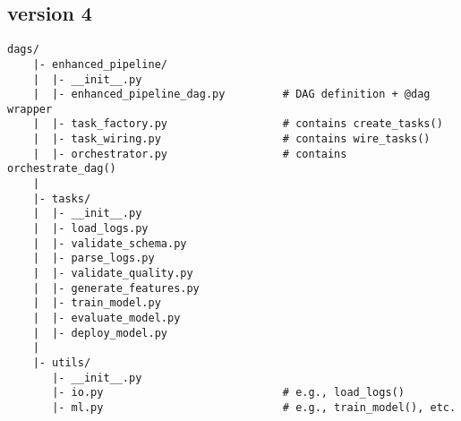 \subsection{version 4}

\begin{lstlisting}[style=tree, caption={Modular DAG file structure (ASCII-safe)}, label={lst:dag_tree_ascii}]
    dags/
    |- enhanced_pipeline/
    |  |- __init__.py
    |  |- enhanced_pipeline_dag.py         # DAG definition + @dag wrapper
    |  |- task_factory.py                  # contains create_tasks()
    |  |- task_wiring.py                   # contains wire_tasks()
    |  |- orchestrator.py                  # contains orchestrate_dag()
    |
    |- tasks/
    |  |- __init__.py
    |  |- load_logs.py
    |  |- validate_schema.py
    |  |- parse_logs.py
    |  |- validate_quality.py
    |  |- generate_features.py
    |  |- train_model.py
    |  |- evaluate_model.py
    |  |- deploy_model.py
    |
    |- utils/
       |- __init__.py
       |- io.py                            # e.g., load_logs()
       |- ml.py                            # e.g., train_model(), etc.
    
\end{lstlisting}

